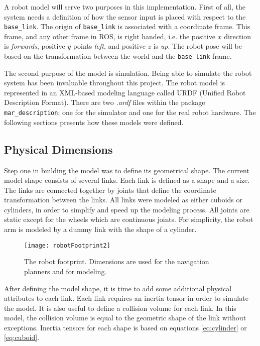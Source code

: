 A robot model will serve two purposes in this implementation. First of all, the system needs a definition of how the sensor input is placed with respect to the \texttt{base\_link}. The origin of \texttt{base\_link} is associated  with a coordinate frame. This frame, and any other frame in \ac{ROS}, is right handed, i.e. the positive $x$ direction is \textit{forwards}, positive $y$ points \textit{left}, and positive $z$ is \textit{up}. The robot pose will be based on the transformation between the world and the \texttt{base\_link} frame. 

The second purpose of the model is simulation. Being able to simulate the robot system has been invaluable throughout this project. The robot model is represented in an XML-based modeling language called \ac{URDF} (Unified Robot Description Format). There are two \textit{.urdf} files within the package \texttt{mar\_description}; one for the simulator and one for the real robot hardware. The following sections presents how these models were defined.


\subsection{Physical Dimensions}

Step one in building the model was to define its geometrical shape. The current model shape consists of several links. Each link is defined as a shape and a size. The links are connected together by joints that define the coordinate transformation between the links. All links were modeled as either cuboids or cylinders, in order to simplify and speed up the modeling process. All joints are static except for the wheels which are continuous joints. For simplicity, the robot arm is modeled by a dummy link with the shape of a cylinder.

\begin{figure}[h]
	\centering
	\texttt{[image: robotFootprint2]}
	\caption{The robot footprint. Dimensions are used for the navigation planners and for modeling. }
	\label{fig:robotFootprint}
\end{figure}

After defining the model shape, it is time to add some additional physical attributes to each link. Each link requires an inertia tensor in order to simulate the model. It is also useful to define a collision volume for each link. In this model, the collision volume is equal to the geometric shape of the link without exceptions. Inertia tensors for each shape is based on equations \ref{eq:cylinder} or \ref{eq:cuboid}.

